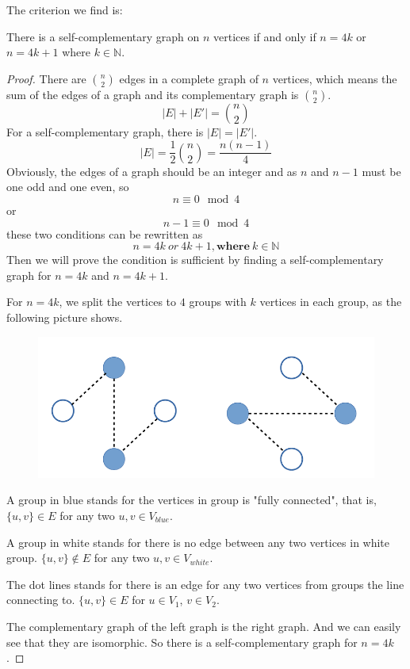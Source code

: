 

The criterion we find is:
\par
There is a self-complementary graph on $n$ vertices if and only if $n=4k$ or $n=4k+1$ where $k \in \mathbb{N}$.
\begin{proof}
There are $n \choose 2$ edges in a complete graph of $n$ vertices, which means the sum of the edges of a graph and its complementary graph is $n \choose 2$.
$$|E|+|E'|={n \choose 2}$$
For a self-complementary graph, there is $|E| = |E'|$.
$$|E|=\frac{1}{2} {n \choose 2}=\frac{n(n-1)}{4}$$
Obviously, the edges of a graph should be an integer and as $n$ and $n-1$ must be one odd and one even, so 
$$n \equiv 0 \mod 4$$ 
or 
$$n-1 \equiv 0 \mod 4$$
these two conditions can be rewritten as
$$n=4k ~or~ 4k+1, \textbf{where} ~ k\in \mathbb{N}$$ 
Then we will prove the condition is sufficient by finding a self-complementary graph for $n=4k$ and $n=4k+1$.

\par
For $n=4k$, we split the vertices to $4$ groups with $k$ vertices in each group, as the following picture shows.

\begin{figure}[hpbt]
\begin{center}
\includegraphics[width=0.6 \textwidth]{Ex6-6_1.png}
\end{center}
\end{figure}

A group in blue stands for the vertices in group is "fully connected", that is, $ \{u, v\} \in E $ for any two $u,v \in V_{blue}$. 
\par A group in white stands for there is no edge between any two vertices in white group. $ \{u, v\} \not \in E$ for any two $u,v \in V_{white}$.
\par The dot lines stands for there is an edge for any two vertices from groups the line connecting to. $ \{u, v\} \in E$ for $u \in V_1$, $v \in V_2$. 
\par 
The complementary graph of the left graph is the right graph. And we can easily see that they are isomorphic. So there is a self-complementary graph for $n=4k$.



\end{proof}
